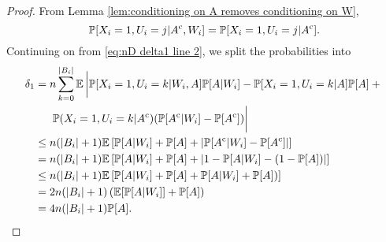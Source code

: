 \begin{proof}
		From Lemma \ref{lem:conditioning on A removes conditioning on W},
		\begin{equation}
			\mathbb{P}[X_i = 1, U_i = j | A^{\mathrm{c}}, W_i] = \mathbb{P}[X_i = 1, U_i = j | A^{\mathrm{c}}].
		\end{equation} 
		Continuing on from \eqref{eq:nD delta1 line 2}, we split the probabilities into
		\begin{align}
			\delta_1 &= n \sum_{k = 0}^{|B_i|} \expect \left| \prob[X_i = 1, U_i = k|W_i, A]\prob[A|W_i] - \prob[X_i = 1, U_i = k| A]\prob[A] + \vphantom{A^\complement} \vphantom{\frac{1}{2}}\right.\\
			&\hphantom{= .} \left.\prob(X_i = 1, U_i = k | A^\complement) (\prob[A^\complement|W_i] - \prob[A^\complement]) \vphantom{\frac{1}{2}}\right| \notag \\
			&\leq n (|B_i| + 1) \expect\left[ \prob[A|W_i] + \prob[A] + \left|\prob[A^\complement|W_i] - \prob[A^\complement]\right|\right]\\
			&= n (|B_i| + 1) \expect\left[ \prob[A|W_i] + \prob[A] + \left|1 - \prob[A|W_i] - (1 - \prob[A])\right|\right]\\
			&\leq n (|B_i| + 1) \expect\left[ \prob[A|W_i] + \prob[A] + \prob[A|W_i] + \prob[A])\right]\\
			&= 2 n (|B_i| + 1) \left(\expect[\prob[A|W_i]] + \prob[A]\right)\\
			&= 4 n (|B_i| + 1) \prob[A].
		\end{align}


\end{proof}
